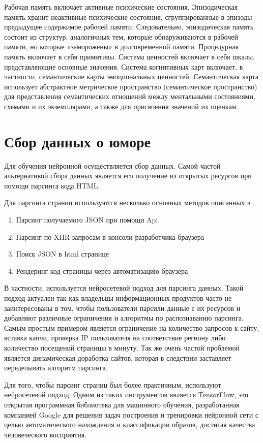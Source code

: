 Рабочая память включает активные психические состояния. Эпизодическая память хранит неактивные психические состояния, сгруппированные 
в эпизоды - предыдущее содержимое рабочей памяти. Следовательно, эпизодическая память состоит из структур, аналогичных тем, которые 
обнаруживаются в рабочей памяти, но которые «заморожены» в долговременной памяти. Процедурная память включает в себя примитивы. Система 
ценностей включает в себя шкалы, представляющие основные значения. Система когнитивных карт включает, в частности, семантические карты 
эмоциональных ценностей. Семантическая карта использует абстрактное метрическое пространство (семантическое пространство) для представления 
семантических отношений между ментальными состояниями, схемами и их экземплярами, а также для присвоения значений их оценкам.

\section{Сбор данных о юморе}
Для обучения нейронной осуществляется сбор данных. Самой частой альтернативой сбора данных является его получение из открытых ресурсов при помощи парсинга кода HTML.

Для парсинга страниц используются несколько основных методов описанных в \cite{parser02}.
\begin{enumerate}
  \item Парсинг получаемого JSON при помощи Api
  \item Парсинг по XHR запросам в консоли разработчика браузера
  \item Поиск JSON в html странице
  \item Рендеринг код страницы через автоматизацию браузера
\end{enumerate}

В частности, используется нейросетевой подход для парсинга данных. Такой подход актуален так как владельцы информационных продуктов 
часто не заинтересованы в том, чтобы пользователи парсили данные с их ресурсов и добавляют различные ограничения и алгоритмы по распознаванию 
парсинга. Самым простым примером является ограничение на количество запросов к сайту, вставка капчи, проверка IP пользователя на соответствие 
региону либо количество посещений страницы в минуту. Так же очень частой проблемой является динамическая доработка сайтов, которая в следствии 
заставляет переделывать алгоритм парсинга.

Для того, чтобы парсинг страниц был более практичным, используют нейросетевой подход. Одним из таких инструментов является TensorFlow, 
это открытая программная библиотека для машинного обучения, разработанная компанией Google для решения задач построения и тренировки 
нейронной сети с целью автоматического нахождения и классификации образов, достигая качества человеческого восприятия. 

